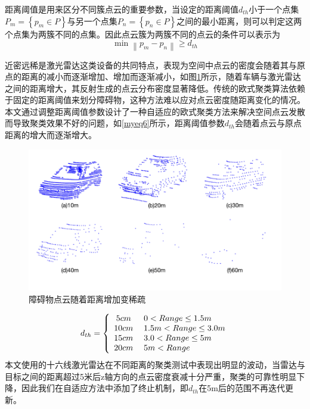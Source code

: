 距离阈值是用来区分不同簇点云的重要参数，当设定的距离阈值${d_{th}}$小于一个点集${P_m} = \left\{ {{p_m} \in P} \right\}$与另一个点集${P_n} = \left\{ {{p_n} \in P} \right\}$之间的最小距离，则可以判定这两个点集为两簇不同的点集。因此点云簇为两簇不同的点云的条件可以表示为
\begin{equation}
    \min \left\| {{p_m} - {p_n}} \right\| \ge {d_{th}}
    \label{myeq5}
\end{equation}

近密远稀是激光雷达这类设备的共同特点，表现为空间中点云的密度会随着其与原点的距离的减小而逐渐增加、增加而逐渐减小，如图\ref{fcarpoints}所示，随着车辆与激光雷达之间的距离增大，其反射生成的点云分布密度显著降低。传统的欧式聚类算法依赖于固定的距离阈值来划分障碍物，这种方法难以应对点云密度随距离变化的情况。本文通过调整距离阈值参数设计了一种自适应的欧式聚类方法来解决空间点云发散而导致聚类效果不好的问题，如\eqref{myeq6}所示，距离阈值参数$d_{th}$会随着点云与原点距离的增大而逐渐增大。

\begin{figure}[htbp]
    \centering
    \includegraphics[scale=0.75]{Fig/carpoints.png}
    \caption{\label{fcarpoints}障碍物点云随着距离增加变稀疏}
\end{figure}
\begin{equation}
    {d_{th}} = \left\{ {\begin{array}{*{20}{c}}
{5cm}\\
{10cm}\\
{15cm}\\
{20cm}
\end{array}} \right.{\rm{ }}\begin{array}{*{20}{l}}
{0 < Range \le 1.5m}\\
{1.5m < Range \le 3.0m}\\
{3.0 < Range \le 5m}\\
{5m < Range}
\end{array}
    \label{myeq6}
\end{equation}
本文使用的十六线激光雷达在不同距离的聚类测试中表现出明显的波动，当雷达与目标之间的距离超过5米后z轴方向的点云密度衰减十分严重，聚类的可靠性明显下降，因此我们在自适应方法中添加了终止机制，即$d_{th}$在5m后的范围不再迭代更新。

